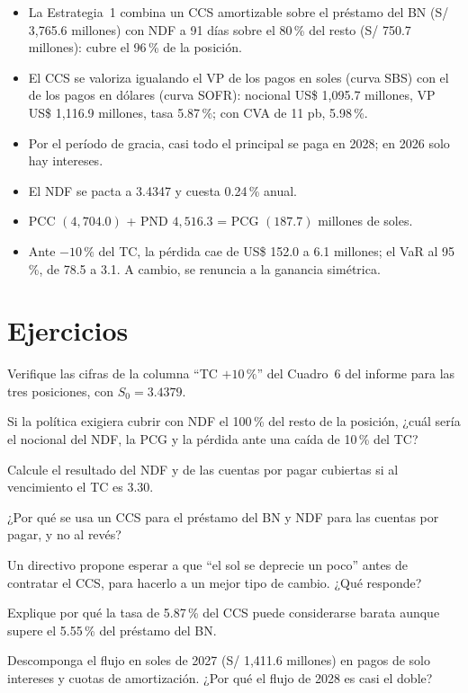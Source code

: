 \begin{resumen}
\begin{itemize}
\item La Estrategia~1 combina un CCS amortizable sobre el préstamo del BN (S/ 3,765.6 millones) con NDF a 91 días sobre el 80\,\% del resto (S/ 750.7 millones): cubre el 96\,\% de la posición.
\item El CCS se valoriza igualando el VP de los pagos en soles (curva SBS) con el de los pagos en dólares (curva SOFR): nocional US\$ 1,095.7 millones, VP US\$ 1,116.9 millones, tasa 5.87\,\%; con CVA de 11 pb, 5.98\,\%.
\item Por el período de gracia, casi todo el principal se paga en 2028; en 2026 solo hay intereses.
\item El NDF se pacta a 3.4347 y cuesta 0.24\,\% anual.
\item PCC $(4{,}704.0)$ + PND $4{,}516.3$ = PCG $(187.7)$ millones de soles.
\item Ante $-10\,\%$ del TC, la pérdida cae de US\$ 152.0 a 6.1 millones; el VaR al 95\,\%, de 78.5 a 3.1. A cambio, se renuncia a la ganancia simétrica.
\end{itemize}
\end{resumen}

\section*{Ejercicios}

\ejercicio[cálculo] Verifique las cifras de la columna \enquote{TC $+10\,\%$} del Cuadro~6 del informe para las tres posiciones, con $S_0=3.4379$.

\ejercicio[cálculo] Si la política exigiera cubrir con NDF el 100\,\% del resto de la posición, ¿cuál sería el nocional del NDF, la PCG y la pérdida ante una caída de 10\,\% del TC?

\ejercicio[cálculo] Calcule el resultado del NDF y de las cuentas por pagar cubiertas si al vencimiento el TC es 3.30.

\ejercicio[conceptual] ¿Por qué se usa un CCS para el préstamo del BN y NDF para las cuentas por pagar, y no al revés?

\ejercicio[conceptual] Un directivo propone esperar a que \enquote{el sol se deprecie un poco} antes de contratar el CCS, para hacerlo a un mejor tipo de cambio. ¿Qué responde?

\ejercicio[conceptual] Explique por qué la tasa de 5.87\,\% del CCS puede considerarse barata aunque supere el 5.55\,\% del préstamo del BN.

\ejercicio[cálculo] Descomponga el flujo en soles de 2027 (S/ 1,411.6 millones) en pagos de solo intereses y cuotas de amortización. ¿Por qué el flujo de 2028 es casi el doble?
